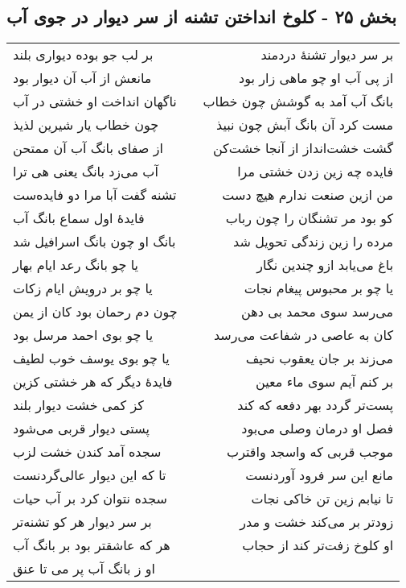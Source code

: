 \begin{center}
\section*{بخش ۲۵ - کلوخ انداختن تشنه از سر دیوار در جوی آب}
\label{sec:sh025}
\begin{longtable}{l p{0.5cm} r}
بر لب جو بوده دیواری بلند
&&
بر سر دیوار تشنهٔ دردمند
\\
مانعش از آب آن دیوار بود
&&
از پی آب او چو ماهی زار بود
\\
ناگهان انداخت او خشتی در آب
&&
بانگ آب آمد به گوشش چون خطاب
\\
چون خطاب یار شیرین لذیذ
&&
مست کرد آن بانگ آبش چون نبیذ
\\
از صفای بانگ آب آن ممتحن
&&
گشت خشت‌انداز از آنجا خشت‌کن
\\
آب می‌زد بانگ یعنی هی ترا
&&
فایده چه زین زدن خشتی مرا
\\
تشنه گفت آبا مرا دو فایده‌ست
&&
من ازین صنعت ندارم هیچ دست
\\
فایدهٔ اول سماع بانگ آب
&&
کو بود مر تشنگان را چون رباب
\\
بانگ او چون بانگ اسرافیل شد
&&
مرده را زین زندگی تحویل شد
\\
یا چو بانگ رعد ایام بهار
&&
باغ می‌یابد ازو چندین نگار
\\
یا چو بر درویش ایام زکات
&&
یا چو بر محبوس پیغام نجات
\\
چون دم رحمان بود کان از یمن
&&
می‌رسد سوی محمد بی دهن
\\
یا چو بوی احمد مرسل بود
&&
کان به عاصی در شفاعت می‌رسد
\\
یا چو بوی یوسف خوب لطیف
&&
می‌زند بر جان یعقوب نحیف
\\
فایدهٔ دیگر که هر خشتی کزین
&&
بر کنم آیم سوی ماء معین
\\
کز کمی خشت دیوار بلند
&&
پست‌تر گردد بهر دفعه که کند
\\
پستی دیوار قربی می‌شود
&&
فصل او درمان وصلی می‌بود
\\
سجده آمد کندن خشت لزب
&&
موجب قربی که واسجد واقترب
\\
تا که این دیوار عالی‌گردنست
&&
مانع این سر فرود آوردنست
\\
سجده نتوان کرد بر آب حیات
&&
تا نیابم زین تن خاکی نجات
\\
بر سر دیوار هر کو تشنه‌تر
&&
زودتر بر می‌کند خشت و مدر
\\
هر که عاشقتر بود بر بانگ آب
&&
او کلوخ زفت‌تر کند از حجاب
\\
او ز بانگ آب پر می تا عنق

\end{longtable}
\end{center}
